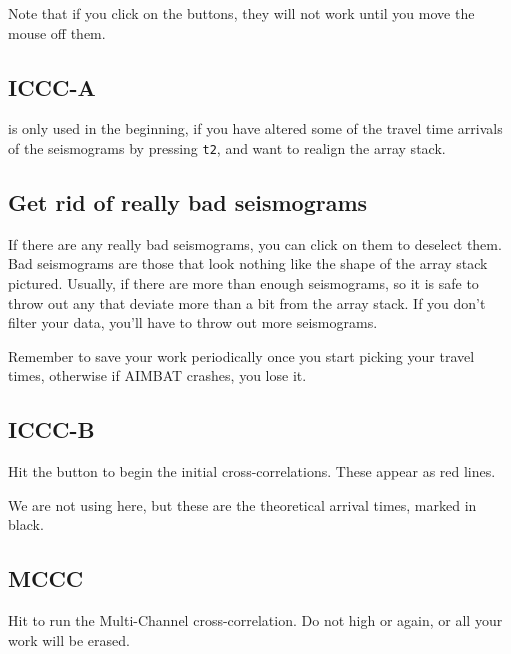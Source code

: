 \documentclass[letterpaper,10pt]{article}
\begin{document}
Note that if you click on the buttons, they will not work until you move the mouse off them.


\subsection{ICCC-A}

 is only used in the beginning, if you have altered some of the travel time arrivals of the seismograms by pressing \texttt{t2}, and want to realign the array stack. 


\subsection{Get rid of really bad seismograms}

If there are any really bad seismograms, you can click on them to deselect them. Bad seismograms are those that look nothing like the shape of the array stack pictured. Usually, if there are more than enough seismograms, so it is safe to throw out any that deviate more than a bit from the array stack. If you don't filter your data, you'll have to throw out more seismograms. 

Remember to save your work periodically once you start picking your travel times, otherwise if AIMBAT crashes, you lose it. 


\subsection{ICCC-B}

Hit the  button to begin the initial cross-correlations. These appear as red lines. 

We are not using  here, but these are the theoretical arrival times, marked in black. 



\subsection{MCCC}

Hit  to run the Multi-Channel cross-correlation. Do not high  or  again, or all your work will be erased. 
\end{document}
